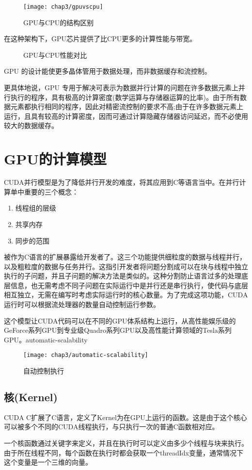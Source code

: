     \begin{figure}[htp]
      \centering
      \texttt{[image: chap3/gpuvscpu]}
      \caption{GPU与CPU的结构区别}
    \end{figure}
    在这种架构下，GPU芯片提供了比CPU更多的计算性能与带宽。
    \begin{figure}[htp]
      \centering
      \hspace{1cm}
      \caption{GPU与CPU性能对比}
    \end{figure}
    GPU 的设计能使更多晶体管用于数据处理，而非数据缓存和流控制。
    \par
    更具体地说，GPU 专用于解决可表示为数据并行计算的问题在许多数据元素上并行执行的程序，具有极高的计算密度(数学运算与存储器运算的比率)。由于所有数据元素都执行相同的程序，因此对精密流控制的要求不高;由于在许多数据元素上运行，且具有较高的计算密度，因而可通过计算隐藏存储器访问延迟，而不必使用较大的数据缓存。
  \section{GPU的计算模型}
    CUDA并行模型是为了降低并行开发的难度，将其应用到C等语言当中。在并行计算单中重要的三个概念：
    \begin{enumerate}
      \item 线程组的层级
      \item 共享内存
      \item 同步的范围
    \end{enumerate}
    被作为C语言的扩展暴露给开发者了。这三个功能提供细粒度的数据与线程并行，以及粗粒度的数据与任务并行。这指引开发者将问题分割成可以在块与线程中独立执行的子问题，并且子问题的解决方法是类似的。这种分割防止语言过多的处理底层信息，也无需考虑不同子问题在实际运行中是并行还是串行执行，使代码与底层相互独立，无需在编写时考虑实际运行时的核心数量。为了完成这项功能，CUDA运行时可以根据流处理器的数量自动控制运行参数。
    \par
    这个模型让CUDA代码可以在不同的GPU体系结构上运行，从高性能娱乐级的GeForce系列GPU到专业级Quadro系列GPU以及高性能计算领域的Tesla系列GPU。automatic-scalability
    \begin{figure}[htp]
      \centering
      \texttt{[image: chap3/automatic-scalability]}
      \caption{自动控制执行}
    \end{figure}
    \subsection{核(Kernel)}
      CUDA C扩展了C语言，定义了Kernel为在GPU上运行的函数。这是由于这个核心可以被多个不同的CUDA线程执行，与只执行一次的普通C函数相对应。
      \par
      一个核函数通过关键字来定义，并且在执行时可以定义由多少个线程与块来执行。由于所在线程不同，每个函数在执行时都会获取一个threadIdx变量，通常情况下这个变量是一个三维的向量。
